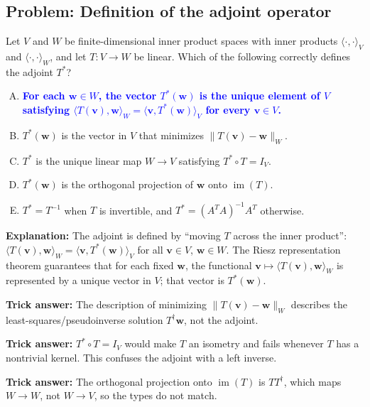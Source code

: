 \documentclass[12pt]{amsart}
\begin{document}
\subsection*{Problem: Definition of the adjoint operator}

Let $V$ and $W$ be finite-dimensional inner product spaces with inner products
$\langle\cdot,\cdot\rangle_V$ and $\langle\cdot,\cdot\rangle_W$, and let
$T: V \to W$ be linear.
Which of the following correctly defines the adjoint $T^*$?

\begin{enumerate}[(A)]
\item \textcolor{blue}{\textbf{For each $\mathbf{w} \in W$, the vector $T^*(\mathbf{w})$ is the unique element of $V$ satisfying $\langle T(\mathbf{v}), \mathbf{w} \rangle_W = \langle \mathbf{v}, T^*(\mathbf{w}) \rangle_V$ for every $\mathbf{v} \in V$.}}
\item $T^*(\mathbf{w})$ is the vector in $V$ that minimizes $\|T(\mathbf{v}) - \mathbf{w}\|_W$.
\item $T^*$ is the unique linear map $W \to V$ satisfying $T^* \circ T = I_V$.
\item $T^*(\mathbf{w})$ is the orthogonal projection of $\mathbf{w}$ onto $\operatorname{im}(T)$.
\item $T^* = T^{-1}$ when $T$ is invertible, and $T^* = (A^TA)^{-1}A^T$ otherwise.
\end{enumerate}

\textbf{Explanation:}
The adjoint is defined by ``moving $T$ across the inner product'':
$\langle T(\mathbf{v}),\mathbf{w}\rangle_W = \langle\mathbf{v},T^*(\mathbf{w})\rangle_V$
for all $\mathbf{v}\in V$, $\mathbf{w}\in W$.
The Riesz representation theorem guarantees that for each fixed $\mathbf{w}$, the
functional $\mathbf{v}\mapsto\langle T(\mathbf{v}),\mathbf{w}\rangle_W$ is represented by a
unique vector in $V$; that vector is $T^*(\mathbf{w})$.

\textbf{Trick answer:}
The description of minimizing $\|T(\mathbf{v})-\mathbf{w}\|_W$ describes the
least-squares/pseudoinverse solution $T^\dagger\mathbf{w}$, not the adjoint.

\textbf{Trick answer:}
$T^*\circ T = I_V$ would make $T$ an isometry and fails whenever $T$ has a
nontrivial kernel.
This confuses the adjoint with a left inverse.

\textbf{Trick answer:}
The orthogonal projection onto $\operatorname{im}(T)$ is $TT^\dagger$, which maps
$W\to W$, not $W\to V$, so the types do not match.
\end{document}

